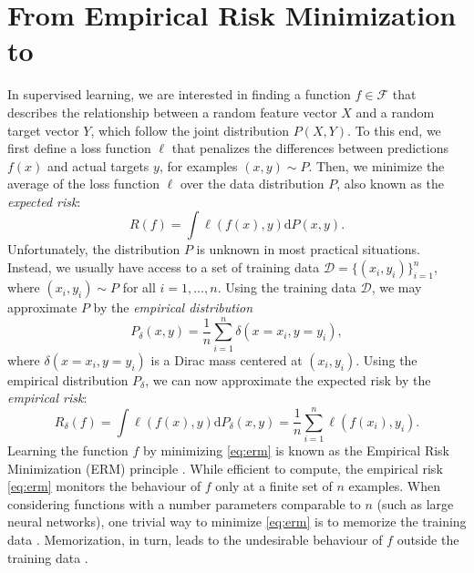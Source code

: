 \section{From Empirical Risk Minimization to \mixup{}}
\label{sec:mixup}

In supervised learning, we are interested in finding a function $f \in
\mathcal{F}$ that describes the relationship between a random feature vector
$X$ and a random target vector $Y$, which follow the joint distribution $P(X,
Y)$.  To this end, we first define a loss function $\ell$ that penalizes the
differences between predictions $f(x)$ and actual targets $y$, for examples
$(x, y) \sim P$.  Then, we minimize the average of the loss function $\ell$
over the data distribution $P$, also known as the \emph{expected risk}:
\begin{equation*}
    R(f) = \int \ell(f(x), y) \mathrm{d} P(x,y).
\end{equation*}
Unfortunately, the distribution $P$ is unknown in most practical situations.
Instead, we usually have access to a set of training data $\mathcal{D} =
\{(x_i, y_i)\}_{i=1}^n$, where $(x_i, y_i) \sim P$ for all $i = 1, \ldots, n$.
Using the training data $\mathcal{D}$, we may approximate $P$ by the
\emph{empirical distribution}
\begin{equation*}
    P_\delta(x, y) = \frac{1}{n} \sum_{i=1}^n \delta(x = x_i, y = y_i),
\end{equation*}
where $\delta(x = x_i, y = y_i)$ is a Dirac mass centered at $(x_i, y_i)$.
Using the empirical distribution $P_\delta$, we can now approximate the
expected risk by the \emph{empirical risk}:
\begin{equation}
    R_\delta(f) = \int \ell(f(x), y) \mathrm{d} P_\delta(x,y) = \frac{1}{n}
    \sum_{i=1}^n \ell(f(x_i), y_i). \label{eq:erm}
\end{equation}
Learning the function $f$ by minimizing \eqref{eq:erm} is known as the
Empirical Risk Minimization (ERM) principle \citep{vapnik98}.  While efficient
to compute, the empirical risk \eqref{eq:erm} monitors the behaviour of $f$
only at a finite set of $n$ examples.  When considering functions with a number
parameters comparable to $n$ (such as large neural networks), one trivial way
to minimize \eqref{eq:erm} is to memorize the training data
\citep{2016arXiv161103530Z}. Memorization, in turn, leads to the undesirable
behaviour of $f$ outside the training data \citep{SzegedyZSBEGF13}.
 
